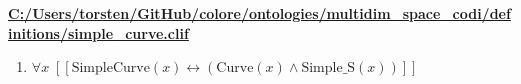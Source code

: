 \documentclass{article}
\begin{document}
\textbf{\url{C:/Users/torsten/GitHub/colore/ontologies/multidim\_space\_codi/definitions/simple\_curve.clif}}

\begin{enumerate}
\item $\forall x\;  \left[ \left[ \textrm{SimpleCurve}(x) \leftrightarrow \left(\textrm{Curve}(x) \land \textrm{Simple\_S}(x)\right) \right] \right]$
\end{enumerate}
\end{document}
